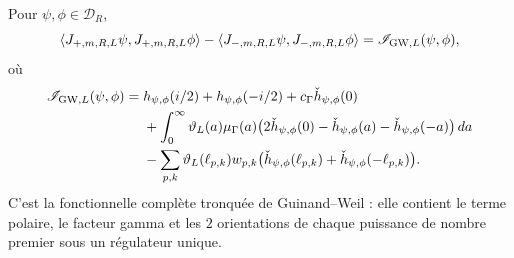 \begin{lemma}
\label{lem:amp-rh-expansion-guinand-weil}
Pour \(\psi,\phi\in\mathcal D_R\),
\begin{equation}\label{eq:amp-rh-diferencia-columnas-regulada}
 \langle J_{+,m,R,L}\psi,J_{+,m,R,L}\phi\rangle
 -\langle J_{-,m,R,L}\psi,J_{-,m,R,L}\phi\rangle
 =
 \mathscr I_{{\rm GW},L}(\psi,\phi),
\end{equation}
où
\begin{align}
 \mathscr I_{{\rm GW},L}(\psi,\phi)
 ={}&
 h_{\psi,\phi}(i/2)+h_{\psi,\phi}(-i/2)
 +c_\Gamma\check h_{\psi,\phi}(0)                 \nonumber\\
 &+\int_0^\infty\vartheta_L(a)\mu_\Gamma(a)
 \bigl(
 2\check h_{\psi,\phi}(0)
 -\check h_{\psi,\phi}(a)
 -\check h_{\psi,\phi}(-a)
 \bigr)\,da                                       \nonumber\\
 &-\sum_{p,k}\vartheta_L(\ell_{p,k})w_{p,k}
 \bigl(
 \check h_{\psi,\phi}(\ell_{p,k})
 +\check h_{\psi,\phi}(-\ell_{p,k})
 \bigr).                              \label{eq:amp-rh-gw-truncado-explicito}
\end{align}
C'est la fonctionnelle complète tronquée de Guinand--Weil : elle contient le terme polaire, le facteur gamma et les \(2\) orientations de chaque puissance de nombre premier sous un régulateur unique.
\end{lemma}

